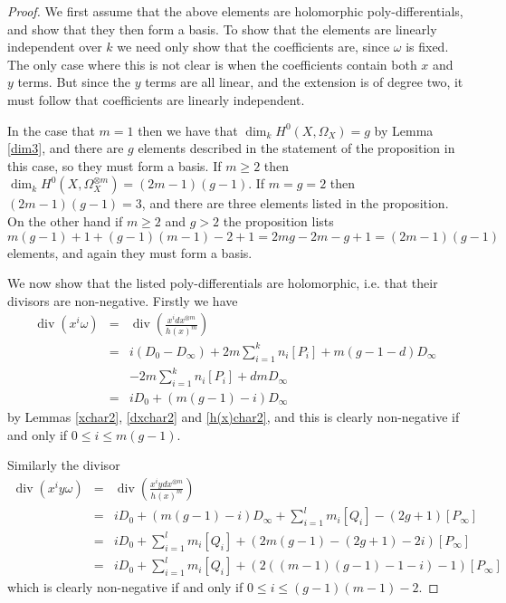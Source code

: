 \documentclass[11pt]{article} %
\theoremstyle{plain}
\theoremstyle{remark}
\DeclareMathOperator{\di}{div}
\begin{document}
\begin{proof}
 We first assume that the above elements are holomorphic poly-differentials, and show that they then form a basis.
To show that the elements are linearly independent over $k$ we need only show that the coefficients are, since $\omega$ is fixed.
The only case where this is not clear is when the coefficients contain both $x$ and $y$ terms.
But since the $y$ terms are all linear, and the extension is of degree two, it must follow that coefficients are linearly independent.
 
 
 In the case that $m=1$ then we have that $\dim_k H^0(X,\Omega_X) =g$ by Lemma \ref{dim3}, and there are $g$ elements described in the statement of the proposition in this case, so they must form a basis.
 If $m \geq 2$ then $\dim_k H^0(X,\Omega_X^{\otimes m}) = (2m-1)(g-1)$.
 If $m=g=2$ then $(2m-1)(g-1) = 3$, and there are three elements listed in the proposition.
 On the other hand if $m\geq 2$ and $g > 2$ the proposition lists
 \[
  m(g-1)+1 + (g-1)(m-1)-2+1 = 2mg -2m -g +1 = (2m-1)(g-1)
 \]
 elements, and again they must form a basis.
 
 We now show that the listed poly-differentials are holomorphic, i.e. that their divisors are non-negative.
 Firstly we have
 \begin{eqnarray}\label{nonydifferentials}
  \di(x^i\omega) & = & \di \left( \frac{x^i dx^{\otimes m}}{h(x)^m} \right) \nonumber \\ \nonumber & = & i(D_0 - D_\infty) +2m\sum_{i=1}^k n_i[P_i] + m(g-1-d)D_\infty \nonumber \\
  & & -2m\sum_{i=1}^k n_i [P_i] + dmD_\infty \nonumber \\
  & = & iD_0 + (m(g-1) -i)D_\infty
 \end{eqnarray}
  by Lemmas \ref{xchar2}, \ref{dxchar2} and \ref{h(x)char2}, and this is clearly non-negative if and only if $0\leq i \leq m(g-1)$.
  
  Similarly the divisor 
  \begin{eqnarray}\label{unramifiedydifferential}
   \di(x^iy\omega) & = & \di \left( \frac{x^i ydx^{\otimes m}}{h(x)^m} \right)\nonumber \\ & = & iD_0 + (m(g-1) -i)D_\infty + \sum_{i=1}^l m_i[Q_i] - (2g+1)[P_\infty] \nonumber \\
    & = & iD_0 +  \sum_{i=1}^l m_i[Q_i] + (2m(g-1) -(2g+1) -2i)[P_\infty] \nonumber  \\
   & = & iD_0 +  \sum_{i=1}^l m_i[Q_i] + (2((m-1)(g-1) -1 -i)-1)[P_\infty]
  \end{eqnarray}
which is clearly non-negative if and only if $0 \leq i \leq (g-1)(m-1)-2$.


\end{proof}
\end{document}
